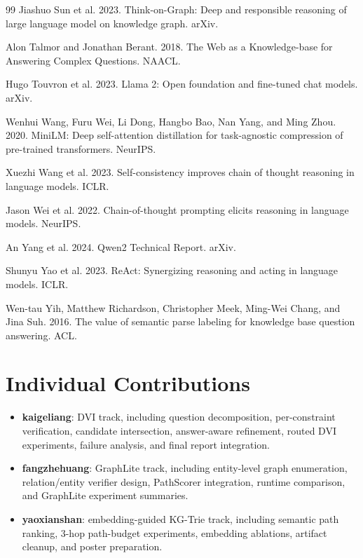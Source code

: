 \documentclass[10pt,twocolumn]{article}
\begin{document}
\begin{thebibliography}{99}
Jiashuo Sun et al. 2023.
Think-on-Graph: Deep and responsible reasoning of large language model on knowledge graph. arXiv.

Alon Talmor and Jonathan Berant. 2018.
The Web as a Knowledge-base for Answering Complex Questions. NAACL.

Hugo Touvron et al. 2023.
Llama 2: Open foundation and fine-tuned chat models. arXiv.

Wenhui Wang, Furu Wei, Li Dong, Hangbo Bao, Nan Yang, and Ming Zhou. 2020.
MiniLM: Deep self-attention distillation for task-agnostic compression of pre-trained transformers. NeurIPS.

Xuezhi Wang et al. 2023.
Self-consistency improves chain of thought reasoning in language models. ICLR.

Jason Wei et al. 2022.
Chain-of-thought prompting elicits reasoning in language models. NeurIPS.

An Yang et al. 2024.
Qwen2 Technical Report. arXiv.

Shunyu Yao et al. 2023.
ReAct: Synergizing reasoning and acting in language models. ICLR.

Wen-tau Yih, Matthew Richardson, Christopher Meek, Ming-Wei Chang, and Jina Suh. 2016.
The value of semantic parse labeling for knowledge base question answering. ACL.
\end{thebibliography}

\section*{Individual Contributions}
\begin{itemize}
  \item \textbf{kaigeliang}: DVI track, including question decomposition, per-constraint verification, candidate intersection, answer-aware refinement, routed DVI experiments, failure analysis, and final report integration.
  \item \textbf{fangzhehuang}: GraphLite track, including entity-level graph enumeration, relation/entity verifier design, PathScorer integration, runtime comparison, and GraphLite experiment summaries.
  \item \textbf{yaoxianshan}: embedding-guided KG-Trie track, including semantic path ranking, 3-hop path-budget experiments, embedding ablations, artifact cleanup, and poster preparation.
\end{itemize}
\end{document}
